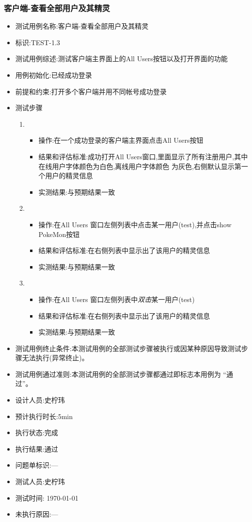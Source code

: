 \documentclass{article}
\begin{document}
\subsubsection{客户端-查看全部用户及其精灵}
\begin{itemize}
\item 测试用例名称:客户端-查看全部用户及其精灵
\item 标识:TEST-1.3
\item 测试用例综述:测试客户端主界面上的All Users按钮以及打开界面的功能
\item 用例初始化:已经成功登录
\item 前提和约束:打开多个客户端并用不同帐号成功登录
\item 测试步骤
  \begin{enumerate}
  \item
    \begin{itemize}
    \item 操作:在一个成功登录的客户端主界面点击All Users按钮
    \item 结果和评估标准:成功打开All Users窗口,里面显示了所有注册用户,其中在线用户字体颜色为白色,离线用户字体颜色
      为灰色,右侧默认显示第一个用户的精灵信息
    \item 实测结果:与预期结果一致
    \end{itemize}
  \item
    \begin{itemize}
    \item 操作:在All Users 窗口左侧列表中点击某一用户(test),并点击show PokeMon按钮
    \item 结果和评估标准:在右侧列表中显示出了该用户的精灵信息
    \item 实测结果:与预期结果一致
    \end{itemize}

  \item
    \begin{itemize}
    \item 操作:在All Users 窗口左侧列表中\emph{双击}某一用户(test)
    \item 结果和评估标准:在右侧列表中显示出了该用户的精灵信息
    \item 实测结果:与预期结果一致
    \end{itemize}



  \end{enumerate}
  
\item 测试用例终止条件:本测试用例的全部测试步骤被执行或因某种原因导致测试步骤无法执行(异常终止)。
\item 测试用例通过准则:本测试用例的全部测试步骤都通过即标志本用例为 “通过”。
\item 设计人员:史柠玮
\item 预计执行时长:5min
\item 执行状态:完成
\item 执行结果:通过
\item 问题单标识:---
\item 测试人员:史柠玮
\item 测试时间: \today
\item 未执行原因:---
\end{itemize}
\end{document}
